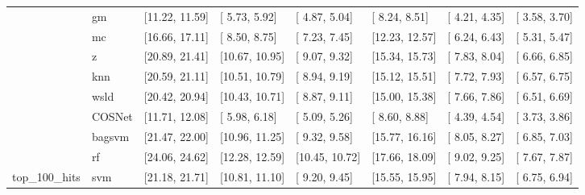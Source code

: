 \begin{table}[H]
{\begin{tabular}{llllllll}
 & gm & [11.22, 11.59] & [ 5.73,  5.92] & [ 4.87,  5.04] & [ 8.24,  8.51] & [ 4.21,  4.35] & [ 3.58,  3.70]\\

 & mc & [16.66, 17.11] & [ 8.50,  8.75] & [ 7.23,  7.45] & [12.23, 12.57] & [ 6.24,  6.43] & [ 5.31,  5.47]\\

 & z & [20.89, 21.41] & [10.67, 10.95] & [ 9.07,  9.32] & [15.34, 15.73] & [ 7.83,  8.04] & [ 6.66,  6.85]\\

 & knn & [20.59, 21.11] & [10.51, 10.79] & [ 8.94,  9.19] & [15.12, 15.51] & [ 7.72,  7.93] & [ 6.57,  6.75]\\

 & wsld & [20.42, 20.94] & [10.43, 10.71] & [ 8.87,  9.11] & [15.00, 15.38] & [ 7.66,  7.86] & [ 6.51,  6.69]\\

 & COSNet & [11.71, 12.08] & [ 5.98,  6.18] & [ 5.09,  5.26] & [ 8.60,  8.88] & [ 4.39,  4.54] & [ 3.73,  3.86]\\

 & bagsvm & [21.47, 22.00] & [10.96, 11.25] & [ 9.32,  9.58] & [15.77, 16.16] & [ 8.05,  8.27] & [ 6.85,  7.03]\\

 & rf & [24.06, 24.62] & [12.28, 12.59] & [10.45, 10.72] & [17.66, 18.09] & [ 9.02,  9.25] & [ 7.67,  7.87]\\

\multirow{-15}{*}{\raggedright\arraybackslash top\_100\_hits} & svm & [21.18, 21.71] & [10.81, 11.10] & [ 9.20,  9.45] & [15.55, 15.95] & [ 7.94,  8.15] & [ 6.75,  6.94]\\
\bottomrule
\end{tabular}}
\end{table}
